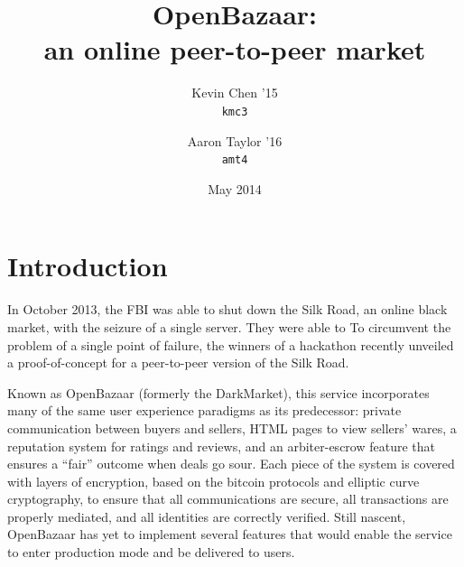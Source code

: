 \documentclass[12pt,twocolumn]{article}
\title{\bf \sc OpenBazaar: \\ an online peer-to-peer market}
\author{
    {\rm Kevin Chen '15} \\
    {\tt kmc3}
    \and 
    {\rm Aaron Taylor '16} \\
    {\tt amt4}
}
\date{May 2014}
\begin{document}
\maketitle

\doublespacing


\newcommand{\OpenBazaar}{}
\def\OpenBazaar/{{\sc OpenBazaar}}

\newcommand{\Entangled}{}
\def\Entanbled/{{\sc Entangled}}

\newcommand{\Kademlia}{}
\def\Kademlia/{{\sc Kademlia}}

\newcommand{\Twisted}{}
\def\Twisted/{{\sc Twisted}}

\newcommand{\Tornado}{}
\def\Tornado/{{\sc Tornado}}

\newcommand{\reactor}{}
\def\reactor/{{\sc reactor}}

\newcommand{\ZMQ}{}
\def\ZMQ/{\O{}MQ}

\section{Introduction}
In October 2013, the FBI was able to shut down the Silk Road, an online black market, with the seizure of a single server. They were able to 
To circumvent the problem of a single point of failure, the winners of a hackathon recently unveiled a proof-of-concept for a peer-to-peer version of the Silk Road.

Known as \OpenBazaar/ (formerly the DarkMarket), this service incorporates many of the same user experience paradigms as its predecessor: private communication between buyers and sellers, HTML pages to view sellers' wares, a reputation system for ratings and reviews, and an arbiter-escrow feature that ensures a ``fair'' outcome when deals go sour. Each piece of the system is covered with layers of encryption, based on the bitcoin protocols and elliptic curve cryptography, to ensure that all communications are secure, all transactions are properly mediated, and all identities are correctly verified.
Still nascent, \OpenBazaar/ has yet to implement several features that would enable the service to enter production mode and be delivered to users.
\end{document}
